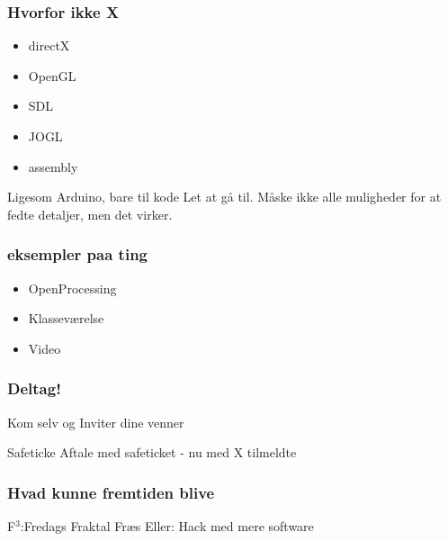 \documentclass{beamer}
\begin{document}
 \begin{frame}
   \frametitle{Hvorfor ikke X}
   
   \begin{itemize}
   \item directX
   \item OpenGL
   \item SDL
   \item JOGL
   \item assembly
   \end{itemize}
   
   \begin{block}{Ligesom Arduino, bare til kode}
     Let at gå til. Måske ikke alle muligheder for at fedte detaljer, men det virker.
   \end{block}
   

   \end{frame}
   
   \begin{frame}
     \frametitle{eksempler paa ting}
     \begin{itemize}
     \item OpenProcessing
     \item Klasseværelse
     \item Video
     \end{itemize}

   \end{frame}
   
   \begin{frame}
     \frametitle{Deltag!}
     Kom selv og Inviter dine venner
     \begin{block}{Safeticke}
       Aftale med safeticket - nu med X tilmeldte
     \end{block}
     
   \end{frame}
   
   \begin{frame}
     \frametitle{Hvad kunne fremtiden blive}

     \begin{block}{F$^3$:Fredags Fraktal Fræs}
       Eller:
       Hack med mere software
     \end{block}

     
   \end{frame}
   
\end{document}
